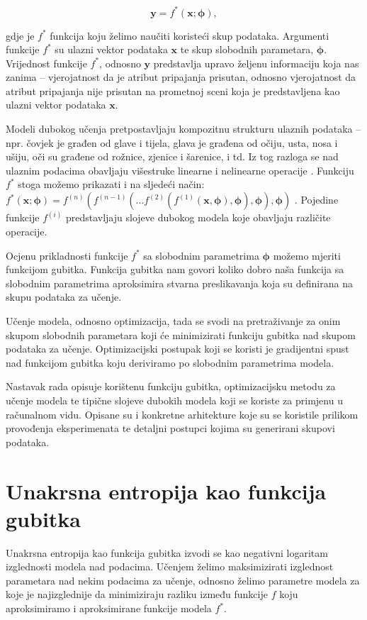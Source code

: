 \documentclass[times, utf8, diplomski, numeric]{fer}
\begin{document}
\begin{equation}
 \mathbf{y} = f^*(\mathbf{x}; \boldsymbol{\phi}),
\end{equation}

\noindent gdje je $f^*$ funkcija koju želimo naučiti koristeći skup podataka. Argumenti funkcije $f^*$ su ulazni vektor podataka $\mathbf{x}$ te skup slobodnih parametara, $\boldsymbol{\phi}$.
Vrijednost funkcije $f^*$, odnosno $\mathbf{y}$ predstavlja upravo željenu informaciju koja nas zanima -- vjerojatnost da je atribut pripajanja prisutan, odnosno vjerojatnost da atribut pripajanja nije prisutan na prometnoj sceni koja je predstavljena kao ulazni vektor podataka $\mathbf{x}$.

Modeli dubokog učenja pretpostavljaju kompozitnu strukturu ulaznih podataka -- npr. čovjek je građen od glave i tijela, glava je građena od očiju, usta, nosa i ušiju, oči su građene od rožnice, zjenice i šarenice, i td.
Iz tog razloga se nad ulaznim podacima obavljaju višestruke linearne i nelinearne operacije \citep{pdf:duboko_0}.
Funkciju $f^*$ stoga možemo prikazati i na sljedeći način:
$f^*(\mathbf{x}; \boldsymbol{\phi})=f^{(n)}(f^{(n-1)}(...f^{(2)}(f^{(1)}(\mathbf{x}, \boldsymbol{\phi}), \boldsymbol{\phi}), \boldsymbol{\phi}), \boldsymbol{\phi})$ \citep{book:deeplearningbook}.
Pojedine funkcije $f^{(i)}$ predstavljaju slojeve dubokog modela koje obavljaju različite operacije.

Ocjenu prikladnosti funkcije $f^*$ sa slobodnim parametrima $\boldsymbol{\phi}$ možemo mjeriti funkcijom gubitka. 
Funkcija gubitka nam govori koliko dobro naša funkcija sa slobodnim parametrima aproksimira stvarna preslikavanja koja su definirana na skupu podataka za učenje.

Učenje modela, odnosno optimizacija, tada se svodi na pretraživanje za onim skupom slobodnih parametara koji će minimizirati funkciju gubitka nad skupom podataka za učenje.
Optimizacijski postupak koji se koristi je gradijentni spust nad funkcijom gubitka koju deriviramo po slobodnim parametrima modela.

Nastavak rada opisuje korištenu funkciju gubitka, optimizacijsku metodu za učenje modela te tipične slojeve dubokih modela koji se koriste za primjenu u računalnom vidu.
Opisane su i konkretne arhitekture koje su se koristile prilikom provođenja eksperimenata te detaljni postupci kojima su generirani skupovi podataka.

\section{Unakrsna entropija kao funkcija gubitka}
Unakrsna entropija kao funkcija gubitka izvodi se kao negativni logaritam izglednosti modela nad podacima. Učenjem želimo maksimizirati izglednost parametara nad nekim podacima za učenje, odnosno želimo parametre modela za koje je najizglednije da minimiziraju razliku između funkcije $f$ koju aproksimiramo i aproksimirane funkcije modela $f^*$.
\end{document}
